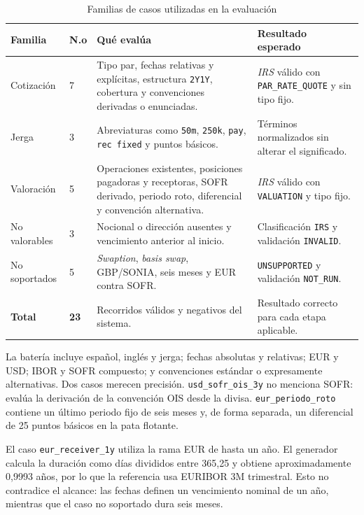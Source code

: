 \begin{table}[H]
\centering
\small
\caption{Familias de casos utilizadas en la evaluación}
\label{tab:familias_casos}
\begin{tabular}{|P{2.4cm}|P{1.1cm}|P{5.0cm}|P{4.3cm}|}
\hline
\textbf{Familia} & \textbf{N.o} & \textbf{Qué evalúa} & \textbf{Resultado esperado} \\
\hline
Cotización & 7 & Tipo par, fechas relativas y explícitas, estructura \texttt{2Y1Y}, cobertura y convenciones derivadas o enunciadas. & \textit{IRS} válido con \texttt{PAR\_RATE\_QUOTE} y sin tipo fijo. \\
\hline
Jerga & 3 & Abreviaturas como \texttt{50m}, \texttt{250k}, \texttt{pay}, \texttt{rec fixed} y puntos básicos. & Términos normalizados sin alterar el significado. \\
\hline
Valoración & 5 & Operaciones existentes, posiciones pagadoras y receptoras, SOFR derivado, periodo roto, diferencial y convención alternativa. & \textit{IRS} válido con \texttt{VALUATION} y tipo fijo. \\
\hline
No valorables & 3 & Nocional o dirección ausentes y vencimiento anterior al inicio. & Clasificación \texttt{IRS} y validación \texttt{INVALID}. \\
\hline
No soportados & 5 & \textit{Swaption}, \textit{basis swap}, GBP/SONIA, seis meses y EUR contra SOFR. & \texttt{UNSUPPORTED} y validación \texttt{NOT\_RUN}. \\
\hline
\textbf{Total} & \textbf{23} & Recorridos válidos y negativos del sistema. & Resultado correcto para cada etapa aplicable. \\
\hline
\end{tabular}
\end{table}

La batería incluye español, inglés y jerga; fechas absolutas y relativas; EUR y USD; IBOR y SOFR compuesto; y convenciones estándar o expresamente alternativas. Dos casos merecen precisión. \texttt{usd\_sofr\_ois\_3y} no menciona SOFR: evalúa la derivación de la convención OIS desde la divisa. \texttt{eur\_periodo\_roto} contiene un último periodo fijo de seis meses y, de forma separada, un diferencial de 25 puntos básicos en la pata flotante.

El caso \texttt{eur\_receiver\_1y} utiliza la rama EUR de hasta un año. El generador calcula la duración como días divididos entre 365,25 y obtiene aproximadamente 0,9993 años, por lo que la referencia usa EURIBOR 3M trimestral. Esto no contradice el alcance: las fechas definen un vencimiento nominal de un año, mientras que el caso no soportado dura seis meses.

